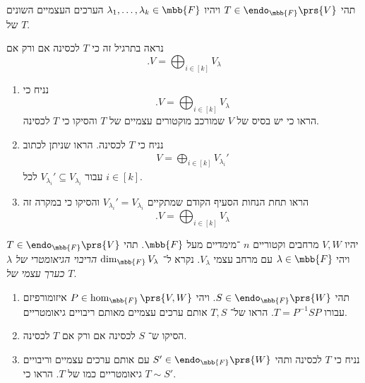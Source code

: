 \documentclass[a4paper,10pt,oneside,openany]{article}
\begin{document}
\begin{exercise}
תהי
$T \in \endo_{\mbb{F}}\prs{V}$
ויהיו
$\lambda_1, \ldots, \lambda_k \in \mbb{F}$
הערכים העצמיים השונים של
$T$.

נראה בתרגיל זה כי
$T$
לכסינה אם ורק אם
\[\text{.} V = \bigoplus_{i \in [k]} V_\lambda\]

\begin{enumerate}
\item נניח כי
\[\text{.} V = \bigoplus_{i \in [k]} V_\lambda\]
הראו כי יש בסיס של
$V$
שמורכב מוקטורים עצמיים של
$T$
והסיקו כי
$T$
לכסינה.

\item נניח כי
$T$
לכסינה. הראו שניתן לכתוב
\begin{align*}
V = \bigoplus_{i \in [k]} V_{\lambda_i}'
\end{align*}
עבור
$V_{\lambda_i}' \subseteq V_{\lambda_i}$
לכל
$i \in [k]$.

\item הראו תחת הנחות הסעיף הקודם שמתקיים
$V_{\lambda_i}' = V_{\lambda_i}$
והסיקו כי במקרה זה
\[\text{.} V = \bigoplus_{i \in [k]} V_\lambda\]
\end{enumerate}
\end{exercise}

\begin{exercise}
יהיו
$V,W$
מרחבים וקטוריים
$n$%
־מימדיים מעל
$\mbb{F}$.
תהי
$T \in \endo_{\mbb{F}}\prs{V}$
ויהי
$\lambda \in \mbb{F}$
עם מרחב עצמי
$V_\lambda$.
נקרא ל־%
$\dim_{\mbb{F}} V_\lambda$
\emph{הריבוי הגיאומטרי של
$\lambda$
כערך עצמי של
$T$}.
\begin{enumerate}
\item 
תהי
$S \in \endo_{\mbb{F}}\prs{W}$.
ויהי
$P \in \hom_{\mbb{F}}\prs{V,W}$
איזומורפיזם עבורו
$T = P^{-1} S P$.
הראו של־%
$T,S$
אותם ערכים עצמיים מאותם ריבויים גיאומטריים.

\item הסיקו ש־%
$S$
לכסינה אם ורק אם
$T$
לכסינה.

\item 
נניח כי
$T$
לכסינה
ותהי
$S' \in \endo_{\mbb{F}}\prs{W}$
עם אותם ערכים עצמיים וריבויים גיאומטריים כמו של
$T$.
הראו כי
$T \sim S'$.
\end{enumerate}
\end{exercise}
\end{document}
